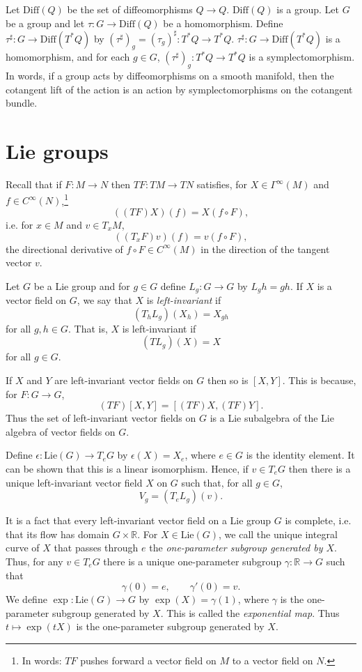\documentclass{article}
\newcommand{\Diff}{\textrm{Diff}}
\newcommand{\Lie}{\textrm{Lie}}
\begin{document}
Let $\Diff(Q)$ be the set of diffeomorphisms $Q \to Q$. $\Diff(Q)$ is a group. Let $G$ be a group and let $\tau:G \to \Diff(Q)$ be a homomorphism.
Define $\tau^\sharp:G \to \Diff(T^*Q)$ by $(\tau^\sharp)_g=(\tau_g)^\sharp:T^*Q \to T^*Q$. 
$\tau^\sharp:G \to \Diff(T^*Q)$ is a homomorphism, and for each $g \in G$, $(\tau^\sharp)_g:T^*Q \to T^*Q$ is a symplectomorphism.
In words, if a group acts by diffeomorphisms on a smooth manifold, then the cotangent lift of the action is an action by symplectomorphisms
on the cotangent bundle.

\section{Lie groups}
Recall that if
$F:M \to N$ then $TF:TM \to TN$ satisfies, for $X \in \Gamma^\infty(M)$ and $f \in C^\infty(N)$,\footnote{In words: $TF$ pushes forward a vector field on $M$ to a vector field
on $N$.}
\[
((TF) X)(f)=X(f \circ F),
\]
i.e. for $x \in M$ and $v \in T_xM$,
\[
((T_x F) v)(f)=v(f\circ F),
\]
the directional derivative of $f \circ F \in C^\infty(M)$ in the direction of the tangent vector $v$.

Let $G$ be a Lie group and for $g \in G$ define $L_g:G \to G$ by $L_g h=gh$. 
If $X$ is a vector field on $G$, we say that $X$ is {\em left-invariant} if 
\[
(T_h L_g)(X_h)=X_{gh}
\]
for all $g,h \in G$. That is, $X$ is left-invariant if 
\[
(T L_g)(X)=X
\]
for all $g \in G$. 

If $X$ and $Y$ are left-invariant vector fields on $G$ then so is $[X,Y]$. This is because, for $F:G \to G$,
\[
(TF)[X,Y]=[(TF)X,(TF)Y].
\]
Thus the set of left-invariant vector fields on $G$ is a Lie subalgebra of the Lie algebra of vector fields on $G$.

Define $\epsilon:\Lie(G) \to T_e G$ by $\epsilon(X)=X_e$, where $e \in G$ is the identity element. It can be shown that this is a linear
isomorphism. Hence, if $v \in T_e G$ then there is a unique left-invariant vector field $X$ on $G$ such that, for all $g \in G$,
\[
V_g=(T_e L_g)(v).
\]

It is a fact that every left-invariant vector field on a Lie group $G$ is complete, i.e. that its flow has domain $G \times \mathbb{R}$. 
For $X \in \Lie(G)$, we call the unique integral curve of $X$ that passes through $e$ the {\em one-parameter subgroup generated by $X$}.
Thus, for any $v \in T_e G$ there is a unique one-parameter subgroup $\gamma:\mathbb{R} \to G$ such that
\[
\gamma(0)=e,\qquad \gamma'(0)=v.
\]
We define $\exp:\Lie(G) \to G$ by $\exp(X)=\gamma(1)$, where $\gamma$ is the one-parameter subgroup generated by $X$.
This is called the {\em exponential map}. Thus $t \mapsto \exp(tX)$ is the one-parameter subgroup generated by $X$.
\end{document}
